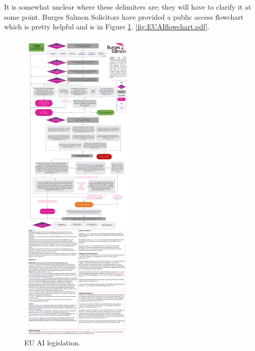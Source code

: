 It is somewhat unclear where these delimiters are; they will have to clarify it at some point. Burges Salmon Solicitors have provided a public access flowchart which is pretty helpful and is in Figure \ref{fig:euaiflowchart}.
\ref{fig:EUAIflowchart.pdf}. 
\begin{figure}[H]
    \centering
    \includegraphics[width=0.5\textwidth]{images/euaiflowchart.pdf}
    \caption{EU AI legislation.}
    \label{fig:euaiflowchart}
\end{figure}


